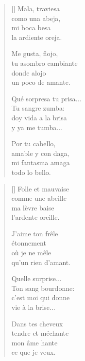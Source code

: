 



\settowidth{\versewidth}{Qué sorpresa tu prisa...}

\bigskip

\begin{verse}[\versewidth]
  Mala, traviesa \\
  como una abeja, \\
  mi boca besa \\
  la ardiente oreja.

  Me gusta, flojo, \\
  tu asombro cambiante \\
  donde alojo \\
  un poco de amante.

  Qué sorpresa tu prisa... \\
  Tu sangre zumba: \\
  doy vida a la brisa \\
  y ya me tumba...

  Por tu cabello, \\
  amable y con daga, \\
  mi fantasma amaga \\
  todo lo bello.
\end{verse}

\newpage



\settowidth{\versewidth}{C'est moi qui donne}

\bigskip

{\itshape
\begin{verse}[\versewidth]
  Folle et mauvaise \\
  comme une abeille \\
  ma lèvre baise \\
  l'ardente oreille.

  J'aime ton frêle \\
  étonnement \\
  où je ne mêle \\
  qu'un rien d'amant.

  Quelle surprise... \\
  Ton sang bourdonne: \\
  c'est moi qui donne \\
  vie à la brise...

  Dans tes cheveux \\
  tendre et méchante \\
  mon âme hante \\
  ce que je veux.
\end{verse}
}
